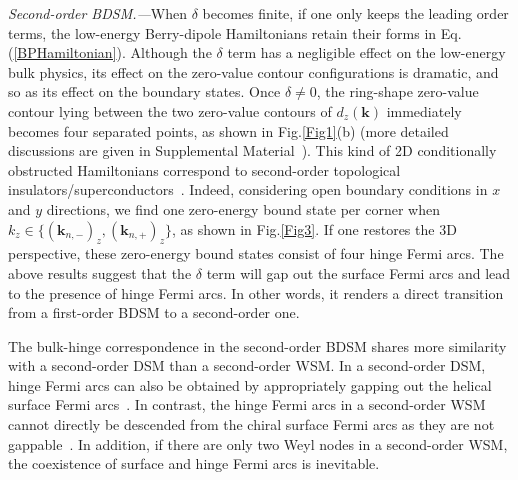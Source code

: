 \documentclass[aps,prl,twocolumn,longbibliography]{revtex4-1}
\newcommand{\bk}{\boldsymbol k}
\begin{document}
{\it Second-order BDSM.---}When $\delta$ becomes finite, if one only keeps the leading order terms,
the low-energy Berry-dipole Hamiltonians retain their forms in Eq.(\ref{BPHamiltonian}).
Although the $\delta$ term has a negligible effect on the low-energy bulk physics,
its effect on the zero-value contour configurations is dramatic, and so as its effect
on the boundary states.  Once $\delta\neq0$,
the ring-shape zero-value contour lying between the two zero-value contours of $d_{z}(\bk)$
immediately becomes four separated points, as shown in Fig.\ref{Fig1}(b) (more detailed
discussions are given in Supplemental Material~\cite{supplemental}). This kind of
2D conditionally obstructed Hamiltonians correspond to second-order topological insulators/superconductors~\cite{Yan2019hosca}. Indeed,
considering open boundary conditions in $x$ and $y$ directions, we find one zero-energy bound state per corner when $k_{z}\in\{(\bk_{n,-})_{z},(\bk_{n,+})_{z}\}$, as shown in Fig.\ref{Fig3}. If one
restores the 3D perspective, these zero-energy bound states consist of four hinge Fermi arcs.
The above results suggest that the $\delta$ term  will gap out the surface Fermi arcs
 and lead to the presence of hinge Fermi arcs. In other words,
it renders a direct transition from a first-order BDSM
to a second-order one.




The bulk-hinge correspondence in the second-order BDSM shares more similarity
with a second-order DSM than a second-order WSM. In a second-order DSM,
hinge Fermi arcs can also be obtained by appropriately gapping out the helical surface Fermi arcs~\cite{Szabo2020HOTP}. In contrast,
the hinge Fermi arcs in a second-order WSM cannot directly be descended from the chiral surface Fermi arcs
as they are not gappable~\cite{Wang2020HOWSM,Ghorashi2020HOWSM,Wei2021,Luo2021}. In addition, if there are only two Weyl nodes in a second-order WSM,
the coexistence of surface and hinge Fermi arcs is inevitable.
\end{document}
